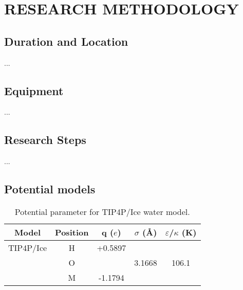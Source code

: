 \chapter{RESEARCH METHODOLOGY}
\section{Duration and Location}
...
\section{Equipment}
...
\section{Research Steps}
...
\section{Potential models}
\begin{table}[h]
	\centering
	\caption{Potential parameter for TIP4P/Ice water model.}
	\begin{tabular}{c c c c c}
		\hline 
		\hline
		Model & Position & q ($e$)&$\sigma$ (\AA) &  $\varepsilon$/$\kappa$ (K)  \\
		\hline
		TIP4P/Ice & H & +0.5897 & & \\
		& O & & 3.1668 & 106.1 \\
		& M & -1.1794& & \\
		
		\hline \hline
		
		
		\hline
	\end{tabular}
	\label{table:potensial-param}
\end{table}